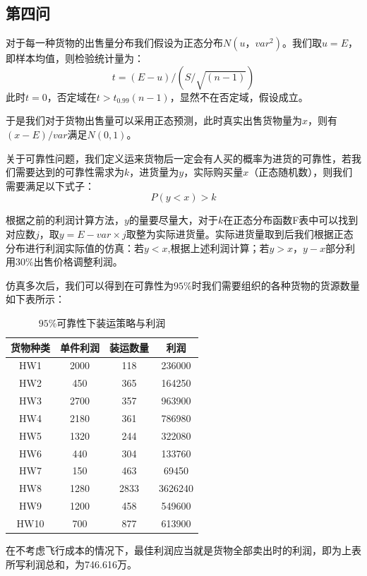 \documentclass{article}
\begin{document}
	\newpage
	\subsection{第四问}
	对于每一种货物的出售量分布我们假设为正态分布$N(u，{var}^2)$。我们取$u=E$，即样本均值，则检验统计量为：
	\begin{equation}
		t=(E-u)/(S/\sqrt{(n-1)})
	\end{equation}
	此时$t=0$，否定域在$t>t_{0.99}(n-1)$，显然不在否定域，假设成立。
	
	于是我们对于货物出售量可以采用正态预测，此时真实出售货物量为$x$，则有$(x-E)/var$满足$N(0,1)$。
	
	关于可靠性问题，我们定义运来货物后一定会有人买的概率为进货的可靠性，若我们需要达到的可靠性需求为$k$，进货量为$y$，实际购买量$x$（正态随机数），则我们需要满足以下式子：
	\begin{equation}
		P(y<x)>k
	\end{equation}
	
	根据之前的利润计算方法，$y$的量要尽量大，对于$k$在正态分布函数F表中可以找到对应数$j$，取$y=E-var\times j$取整为实际进货量。实际进货量取到后我们根据正态分布进行利润实际值的仿真：若$y<x$,根据上述利润计算；若$y>x$，$y-x$部分利用$30\%$出售价格调整利润。
	
	仿真多次后，我们可以得到在可靠性为$95\%$时我们需要组织的各种货物的货源数量如下表所示：
	
	\begin{table}[!h]
		\centering
		\caption{$95\%$可靠性下装运策略与利润}
		\begin{tabular}{|c|c|c|c|}
			\hline
			货物种类 & 单件利润 & 装运数量 & 利润      \\ \hline
			HW1  & 2000 & 118  & 236000  \\ \hline
			HW2  & 450  & 365  & 164250  \\ \hline
			HW3  & 2700 & 357  & 963900  \\ \hline
			HW4  & 2180 & 361  & 786980  \\ \hline
			HW5  & 1320 & 244  & 322080  \\ \hline
			HW6  & 440  & 304  & 133760  \\ \hline
			HW7  & 150  & 463  & 69450   \\ \hline
			HW8  & 1280 & 2833 & 3626240 \\ \hline
			HW9  & 1200 & 458  & 549600  \\ \hline
			HW10 & 700  & 877  & 613900  \\ \hline
		\end{tabular}
	\end{table}
	在不考虑飞行成本的情况下，最佳利润应当就是货物全部卖出时的利润，即为上表所写利润总和，为746.616万。
	
\end{document}
